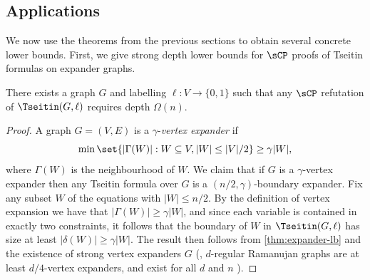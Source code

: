 \subsection{Applications}
We now use the theorems from the previous sections to obtain several concrete lower bounds.
First, we give strong depth lower bounds for $\sCP$ proofs of Tseitin formulas on expander graphs. 
\begin{theorem}\label{cor:TseitinLowerBound}
	There exists a graph $G$ and labelling $\ell:V \rightarrow \{0,1\}$ such that any $\sCP$ refutation of $\Tseitin(G,\ell)$ requires depth $\Omega(n)$. 
\end{theorem}
\begin{proof}
	A graph $G=(V,E)$ is a $\gamma$-\emph{vertex expander} if 
	\[\min \set{|\Gamma(W)| : W \subseteq V, |W| \leq |V|/2} \geq \gamma|W|,\]
	where $\Gamma(W)$ is the neighbourhood of $W$.
	We claim that if $G$ is a $\gamma$-vertex expander then any Tseitin formula over $G$ is a $(n/2, \gamma)$-boundary expander.
	Fix any subset $W$ of the equations with $|W| \leq n/2$. 
	By the definition of vertex expansion we have that $|\Gamma(W)| \geq \gamma|W|$, and since each variable is contained in exactly two constraints, it follows that the boundary of $W$ in $\Tseitin(G,\ell)$ has size at least $|\delta(W)| \geq \gamma|W|$.
	The result then follows from \autoref{thm:expander-lb} and the existence of strong vertex expanders $G$ (\eg, $d$-regular Ramanujan graphs are at least $d/4$-vertex expanders, and exist for all $d$ and $n$ \cite{MarcusSS18}).
\end{proof}

